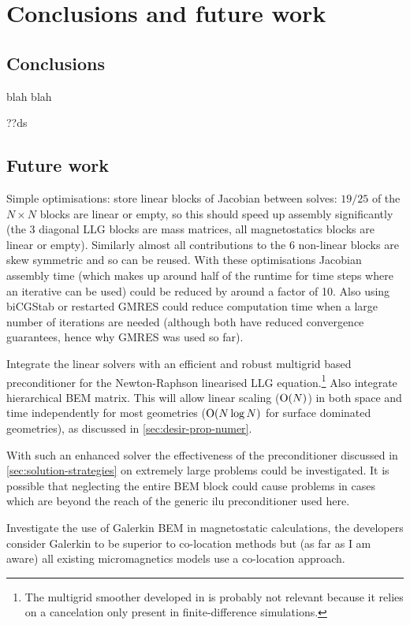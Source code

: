 \chapter{Conclusions and future work}

\section{Conclusions}

blah blah

??ds


\section{Future work}

Simple optimisations: store linear blocks of Jacobian between solves: $19/25$ of the $N \times N$ blocks are linear or empty, so this should speed up assembly significantly (the 3 diagonal LLG blocks are mass matrices, all magnetostatics blocks are linear or empty).
Similarly almost all contributions to the 6 non-linear blocks are skew symmetric and so can be reused.
With these optimisations Jacobian assembly time (which makes up around half of the runtime for time steps where an iterative can be used) could be reduced by around a factor of 10.
Also using biCGStab or restarted GMRES could reduce computation time when a large number of iterations are needed (although both have reduced convergence guarantees, hence why GMRES was used so far).


Integrate the linear solvers with an efficient and robust multigrid based preconditioner for the Newton-Raphson linearised LLG equation.\footnote{The multigrid smoother developed in \cite{Jeong2014} is probably not relevant because it relies on a cancelation only present in finite-difference simulations.}
Also integrate hierarchical BEM matrix.
This will allow linear scaling (\ie $\mathrm{O}{\left( N \right)}$) in both space and time independently for most geometries ($\mathrm{O}{\left( N \log N \right)}$ for surface dominated geometries), as discussed in \cref{sec:desir-prop-numer}.


With such an enhanced solver the effectiveness of the preconditioner discussed in \cref{sec:solution-strategies} on extremely large problems could be investigated.
It is possible that neglecting the entire BEM block could cause problems in cases which are beyond the reach of the generic ilu preconditioner used here.


Investigate the use of Galerkin BEM in magnetostatic calculations, the \hlib developers consider Galerkin to be superior to co-location methods but (as far as I am aware) all existing micromagnetics models use a co-location approach.


